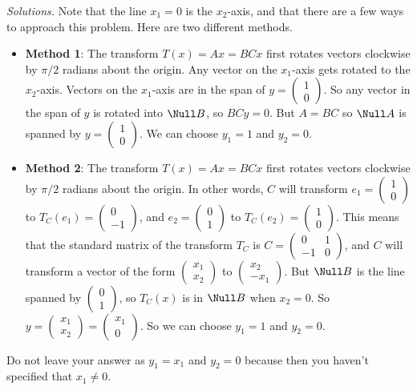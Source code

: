     \ifnum {} {\color{DarkBlue} \textit{Solutions.} 
    Note that the line $x_1=0$ is the $x_2$-axis, and that there are a few ways to approach this problem. Here are two different methods. 
    \begin{itemize}
        \item \textbf{Method 1}: The transform $T(x) = Ax = BCx$ first rotates vectors clockwise by $\pi/2$ radians about the origin. Any vector on the $x_1$-axis gets rotated to the $x_2$-axis. Vectors on the $x_1$-axis are in the span of $y = \begin{pmatrix} 1\\0 \end{pmatrix}$. So any vector in the span of $y$ is rotated into $\Null B$, so $BCy = 0$. But $A=BC$ so $\Null A$ is spanned by $y = \begin{pmatrix} 1\\0\end{pmatrix}$. We can choose $y_1 = 1$ and $y_2=0$. 
        \item \textbf{Method 2}: The transform $T(x) = Ax = BCx$ first rotates vectors clockwise by $\pi/2$ radians about the origin. In other words, $C$ will transform $e_1 = \begin{pmatrix} 1\\0 \end{pmatrix}$ to $T_C(e_1) = \begin{pmatrix} 0\\-1 \end{pmatrix}$, and $e_2 = \begin{pmatrix} 0\\ 1 \end{pmatrix}$ to $T_C(e_2) = \begin{pmatrix} 1\\0 \end{pmatrix}$. This means that the standard matrix of the transform $T_C$ is $C = \begin{pmatrix} 0&1\\-1&0\end{pmatrix}$, and $C$ will transform a vector of the form $\begin{pmatrix}x_1\\x_2 \end{pmatrix}$ to $\begin{pmatrix} x_2 \\ -x_1\end{pmatrix}$. But $\Null B$ is the line spanned by $\begin{pmatrix} 0\\1\end{pmatrix}$, so $T_C(x)$ is in $\Null B$ when $x_2 = 0$. So $y = \begin{pmatrix} x_1 \\ x_2 \end{pmatrix} = \begin{pmatrix}x_1\\0 \end{pmatrix}$. So we can choose $y_1 = 1$ and $y_2 = 0$. 
    \end{itemize}
    Do not leave your answer as $y_1 = x_1$ and $y_2=0$ because then you haven't specified that $x_1 \ne 0$. 
    } 
    
